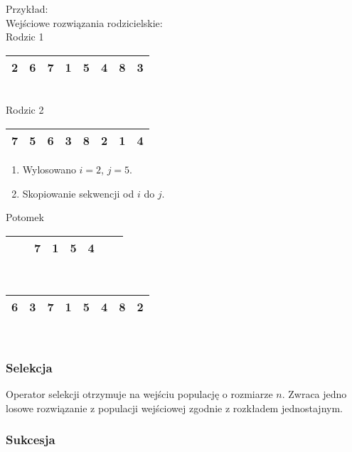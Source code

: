 \documentclass[12pt, a4paper]{article}
\begin{document}
Przykład: \\

Wejściowe rozwiązania rodzicielskie: \\

Rodzic 1
\begin{tabular}{ | c | c | c | c | c | c | c | c |}
  \hline
  2 & 6 &  \cellcolor{green!25}7 & \cellcolor{green!25}1 & \cellcolor{green!25}5 & \cellcolor{green!25}4 & 8 & 3 \\ \hline
\end{tabular}\\
Rodzic 2
\begin{tabular}{ | c | c | c | c | c | c | c | c |}
  \hline
  7 & 5 & 6 & 3 & 8 & 2 & 1 & 4 \\ \hline
\end{tabular}

\begin{enumerate}
 \item Wylosowano $i = 2$, $j = 5$.

 \item Skopiowanie sekwencji od $i$ do $j$. \\
\end{enumerate}

Potomek\\
\begin{tabular}{ | c | c | c | c | c | c | c | c |}
 \hline
   &  &  \cellcolor{green!25}7 & \cellcolor{green!25}1 & \cellcolor{green!25}5 & \cellcolor{green!25}4 &  &  \\ \hline
\end{tabular}\\

\begin{tabular}{ | c | c | c | c | c | c | c | c |}
 \hline
  6 & 3 &  \cellcolor{green!25}7 & \cellcolor{green!25}1 & \cellcolor{green!25}5 & \cellcolor{green!25}4 & 8 & 2 \\ \hline
\end{tabular}\\

\subsubsection{Selekcja}

Operator selekcji otrzymuje na wejściu populację o rozmiarze $n$. Zwraca jedno losowe rozwiązanie z populacji wejściowej
zgodnie z rozkładem jednostajnym.

\subsubsection{Sukcesja}
\end{document}
